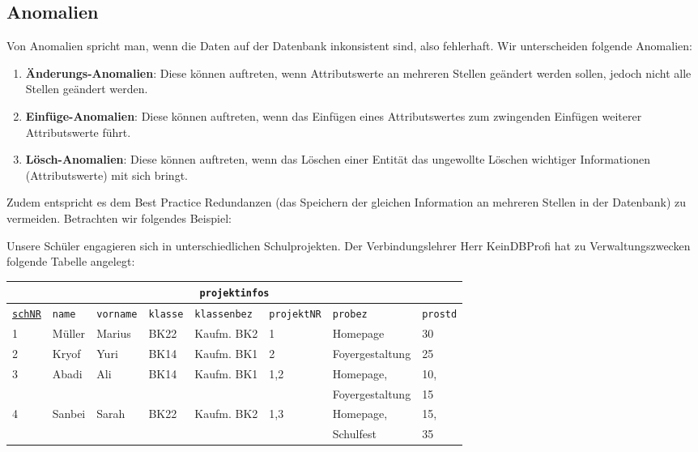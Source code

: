 \subsection[Anomalien]{Anomalien}\label{Anomalien}
Von Anomalien spricht man, wenn die Daten auf der Datenbank inkonsistent sind, also fehlerhaft. Wir unterscheiden folgende Anomalien:

\begin{tcolorbox}[title=Anomalien]
	\begin{enumerate}
		\item \textbf{Änderungs-Anomalien}: Diese können auftreten, wenn Attributswerte an mehreren Stellen geändert werden sollen, jedoch nicht alle Stellen geändert werden.
		\item \textbf{Einfüge-Anomalien}: Diese können auftreten, wenn das Einfügen eines Attributswertes zum zwingenden Einfügen weiterer Attributswerte führt.
		\item \textbf{Lösch-Anomalien}: Diese können auftreten, wenn das Löschen einer Entität das ungewollte Löschen wichtiger Informationen (Attributswerte) mit sich bringt.
	\end{enumerate}
\end{tcolorbox}
Zudem entspricht es dem Best Practice Redundanzen (das Speichern der gleichen Information an mehreren Stellen in der Datenbank) zu vermeiden. Betrachten wir folgendes Beispiel:

Unsere Schüler engagieren sich in unterschiedlichen Schulprojekten. Der Verbindungslehrer Herr KeinDBProfi hat zu Verwaltungszwecken folgende Tabelle angelegt:

\medskip

\begin{tabular}{llllllll}
	\multicolumn{8}{c}{\lstinline!projektinfos!}\\
	\hline
	\underline{\lstinline!schNR!}&\lstinline!name!&\lstinline!vorname!&\lstinline!klasse!&\lstinline!klassenbez!&\lstinline!projektNR!&\lstinline!probez!&\lstinline!prostd!\\
	\hline
	1 &
	Müller &
	Marius &
	BK22 &
	Kaufm. BK2&
	1 &
	Homepage &
	30 \\
	2 &
	Kryof  &
	Yuri &
	BK14 &
	Kaufm. BK1&
	2 &
	Foyergestaltung &
	25 \\
	3 &
	Abadi &
	Ali &
	BK14 &
	Kaufm. BK1&
	1,2 &
	Homepage,&
	10,\\
	&&&&&&Foyergestaltung&15\\
	4 &
	Sanbei &
	Sarah &
	BK22 &
	Kaufm. BK2 &
	1,3 &
	Homepage,&
	15,  \\
	&&&&&&Schulfest&35\\
\end{tabular}

